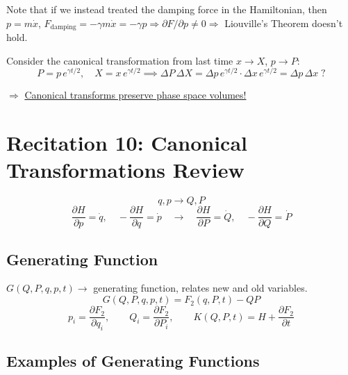 Note that if we instead treated the damping force in the Hamiltonian, then $p = m\dot{x}$, $F_\text{damping} = -\gamma m\dot{x} = -\gamma p \Rightarrow \partial F/\partial p \neq 0 \Rightarrow$ Liouville's Theorem doesn't hold.

Consider the canonical transformation from last time $x \to X$, $p \to P$:
\[
    P = p\,e^{\gamma t/2}, \quad X = x\,e^{\gamma t/2} \implies \Delta P\,\Delta X = \Delta p\,e^{\gamma t/2}\cdot \Delta x\,e^{\gamma t/2} = \Delta p\,\Delta x \;?
\]

$\Rightarrow$ \underline{Canonical transforms preserve phase space volumes!}


\section*{Recitation 10: Canonical Transformations Review}

\[
    q, p \to Q, P
\]
\[
    \frac{\partial H}{\partial p} = \dot{q}, \quad -\frac{\partial H}{\partial q} = \dot{p} \quad \to \quad \frac{\partial H}{\partial P} = \dot{Q}, \quad -\frac{\partial H}{\partial Q} = \dot{P}
\]

\subsection*{Generating Function}

$G(Q,P,q,p,t) \to$ generating function, relates new and old variables.
\[
    G(Q,P,q,p,t) = F_2(q,P,t) - QP
\]
\[
    p_i = \frac{\partial F_2}{\partial q_i}, \qquad Q_i = \frac{\partial F_2}{\partial P_i}, \qquad K(Q,P,t) = H + \frac{\partial F_2}{\partial t}
\]

\subsection*{Examples of Generating Functions}

